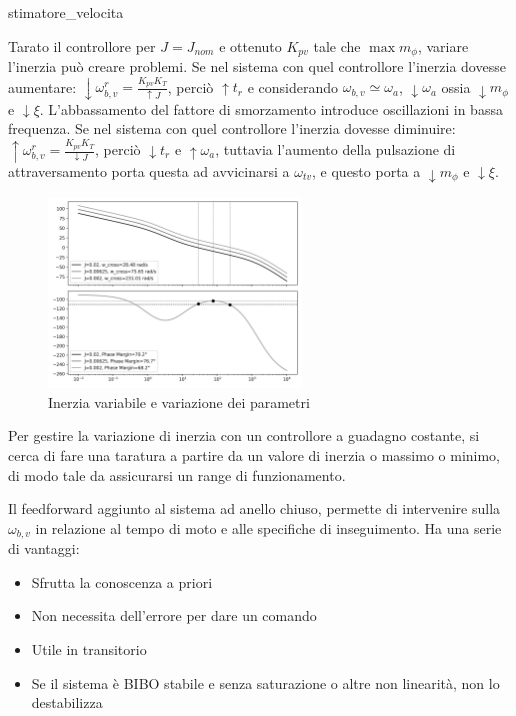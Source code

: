 {stimatore_velocita}

Tarato il controllore per \(J=J_{nom}\) e ottenuto \(K_{pv}\) tale che \(\max{m_\phi}\), variare l'inerzia può creare problemi.
Se nel sistema con quel controllore l'inerzia dovesse aumentare: \(\downarrow \omega_{b,v}^r=\frac{K_{pv}K_T}{\uparrow J}\), perciò \(\uparrow t_r\) e considerando \(\omega_{b,v}\simeq \omega_a\), \(\downarrow \omega_a\) ossia \(\downarrow m_\phi\) e \(\downarrow \xi\). L'abbassamento del fattore di smorzamento introduce oscillazioni in bassa frequenza.
Se nel sistema con quel controllore l'inerzia dovesse diminuire: \(\uparrow \omega_{b,v}^r=\frac{K_{pv}K_T}{\downarrow J}\), perciò \(\downarrow t_r\) e \(\uparrow \omega_a\), tuttavia l'aumento della pulsazione di attraversamento porta questa ad avvicinarsi a \(\omega_{tv}\), e questo porta a \(\downarrow m_\phi\) e \(\downarrow \xi\).

\begin{figure}[h]
    \centering
    \includegraphics[width=0.6\textwidth]{Immagini/anello_velocita_J_variabile.png}
    \caption{Inerzia variabile e variazione dei parametri}
\end{figure}

Per gestire la variazione di inerzia con un controllore a guadagno costante, si cerca di fare una taratura a partire da un valore di inerzia o massimo o minimo, di modo tale da assicurarsi un range di funzionamento.

Il feedforward aggiunto al sistema ad anello chiuso, permette di intervenire sulla \(\omega_{b,v}\) in relazione al tempo di moto e alle specifiche di inseguimento.
Ha una serie di vantaggi:
\begin{itemize}
    \item Sfrutta la conoscenza a priori
    \item Non necessita dell'errore per dare un comando
    \item Utile in transitorio
    \item Se il sistema è BIBO stabile e senza saturazione o altre non linearità, non lo destabilizza
\end{itemize}

